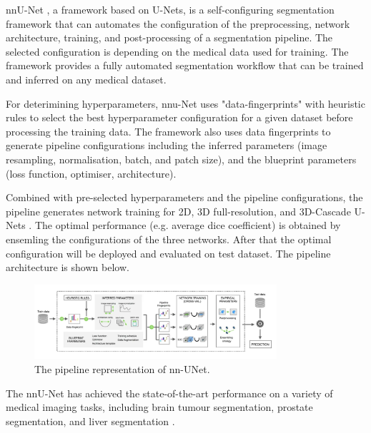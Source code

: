 \noindent nnU-Net \cite{isensee2021nnu}, a framework based on U-Nets, is a self-configuring segmentation framework that can automates the configuration of the preprocessing, network architecture, training, and post-processing of a segmentation pipeline. The selected configuration is depending on the medical data used for training. The framework provides a fully automated segmentation workflow that can be trained and inferred on any medical dataset. \medskip

\noindent For deterimining hyperparameters, nnu-Net uses "data-fingerprints" with heuristic rules to select the best hyperparameter configuration for a given dataset before processing the training data. The framework also uses data fingerprints to generate pipeline configurations including the inferred parameters (image resampling, normalisation, batch, and patch size), and the blueprint parameters (loss function, optimiser, architecture). \medskip

\noindent Combined with pre-selected hyperparameters and the pipeline configurations, the pipeline generates network training for 2D, 3D full-resolution, and 3D-Cascade U-Nets \cite{isensee2018nnu}. The optimal performance (e.g. average dice coefficient) is obtained by ensemling the configurations of the three networks. After that the optimal configuration will be deployed and evaluated on test dataset. The pipeline architecture is shown below. \medskip

\begin{figure}[H]
    \centering
    \includegraphics[width=0.8\textwidth]{./figures/nnunet.png}
    \caption{The pipeline representation of nn-UNet. \cite{nnu-net-medium}}
    \label{fig:hello}
\end{figure}
\noindent The nnU-Net has achieved the state-of-the-art performance on a variety of medical imaging tasks, including brain tumour segmentation, prostate segmentation, and liver segmentation \cite{isensee2019nnu}. \medskip







